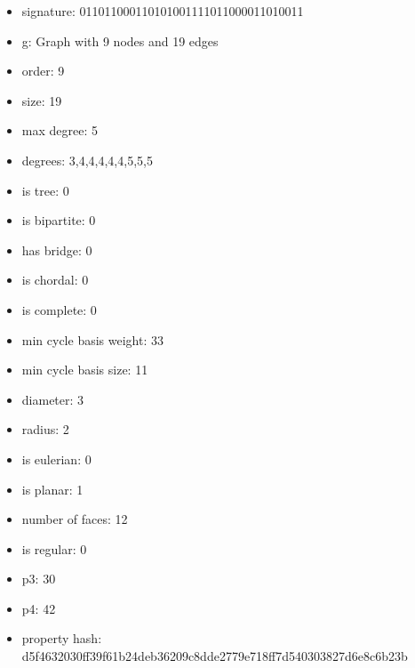 \newpage
\begin{figure}
\end{figure}
\begin{itemize}
\item signature: 011011000110101001111011000011010011
\item g: Graph with 9 nodes and 19 edges
\item order: 9
\item size: 19
\item max degree: 5
\item degrees: 3,4,4,4,4,4,5,5,5
\item is tree: 0
\item is bipartite: 0
\item has bridge: 0
\item is chordal: 0
\item is complete: 0
\item min cycle basis weight: 33
\item min cycle basis size: 11
\item diameter: 3
\item radius: 2
\item is eulerian: 0
\item is planar: 1
\item number of faces: 12
\item is regular: 0
\item p3: 30
\item p4: 42
\item property hash: d5f4632030ff39f61b24deb36209c8dde2779e718ff7d540303827d6e8c6b23b
\end{itemize}
